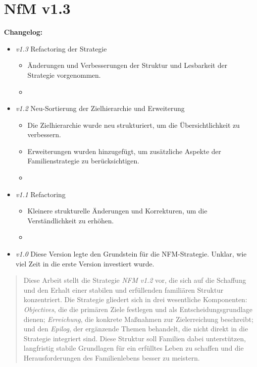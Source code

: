 \chapter{NfM v1.3}
\setcounter{section}{0}



\textbf{Changelog:} \\
\begin{itemize}
	\item \textit{v1.3} Refactoring der Strategie
	\begin{itemize}
		\item Änderungen und Verbesserungen der Struktur und Lesbarkeit der Strategie vorgenommen.
		\item {}
	\end{itemize}
	
	\item \textit{v1.2} Neu-Sortierung der Zielhierarchie und Erweiterung
	\begin{itemize}
		\item Die Zielhierarchie wurde neu strukturiert, um die Übersichtlichkeit zu verbessern.
		\item Erweiterungen wurden hinzugefügt, um zusätzliche Aspekte der Familienstrategie zu berücksichtigen.
		\item {}
	\end{itemize}
	
	\item \textit{v1.1} Refactoring
	\begin{itemize}
		\item Kleinere strukturelle Änderungen und Korrekturen, um die Verständlichkeit zu erhöhen.
		\item {}
	\end{itemize}
	
	\item \textit{v1.0} Diese Version legte den Grundstein für die NFM-Strategie. Unklar, wie viel Zeit in die erste Version investiert wurde.
\end{itemize}
\pagebreak

\renewcommand{\abstractname}{Abstract}

\begin{abstract}
	Diese Arbeit stellt die Strategie \textit{NFM v1.2} vor, die sich auf die Schaffung und den Erhalt einer stabilen und erfüllenden familiären Struktur konzentriert. Die Strategie gliedert sich in drei wesentliche Komponenten: \textit{Objectives}, die die primären Ziele festlegen und als Entscheidungsgrundlage dienen; \textit{Erreichung}, die konkrete Maßnahmen zur Zielerreichung beschreibt; und den \textit{Epilog}, der ergänzende Themen behandelt, die nicht direkt in die Strategie integriert sind. Diese Struktur soll Familien dabei unterstützen, langfristig stabile Grundlagen für ein erfülltes Leben zu schaffen und die Herausforderungen des Familienlebens besser zu meistern.
\end{abstract}


